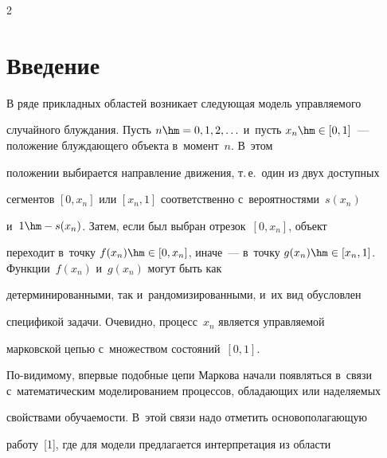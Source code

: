 \thispagestyle{headings}





\begin{multicols}{2}





\label{st\stat}





  \section{Введение}


  


  \vspace*{-3pt}


  


  В ряде прикладных областей возникает следующая модель управ\-ля\-емо\-го 


случайного блуж\-да\-ния. Пусть $n\hm=0, 1, 2,\ldots$  и~пусть $x_n\hm\in 


[0,1]$~--- положение блуж\-да\-юще\-го объекта в~момент~$n$. В~этом 


положении выбирается на\-прав\-ле\-ние движения, т.\,е.\ один из двух до\-ступ\-ных 


сег\-мен\-тов $[0, x_n]$ или $[x_n,1]$ соответственно с~вероятностями~$s(x_n)$ 


и~$1\hm- s(x_n)$. Затем, если был выбран отрезок~$[0,x_n]$, объект 


переходит в~точку $f(x_n)\hm\in [0,x_n]$, иначе~--- в~точку $g(x_n)\hm\in 


[x_n,1]$. Функции~$f(x_n)$ и~$g(x_n)$ могут быть как 


детерминированными, так и~рандомизированными, и~их вид обуслов\-лен 


спецификой задачи. Очевидно, процесс~$x_n$ является управ\-ля\-емой 


марковской цепью с~множеством со\-сто\-яний~$[0,1]$.


  


  По-видимому, впервые подобные цепи Маркова начали появляться в~связи с~математическим моделированием процессов, обладающих или наделяемых 


свойствами обуча\-емости. В~этой связи надо отметить основополагающую 


работу~[1], где для модели предлагается интерпретация из об\-ласти 



\end{multicols}
